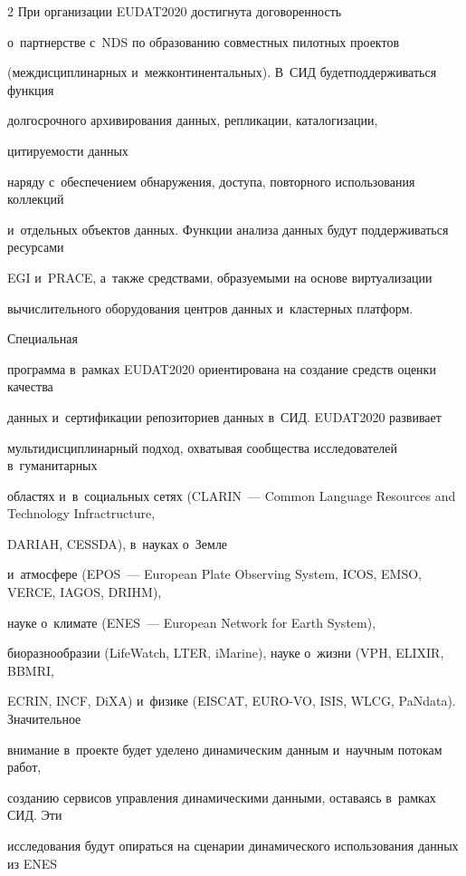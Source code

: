 \begin{multicols}{2}
При организации EUDAT2020 достигнута договоренность 


о~партнерстве с~NDS по образованию совместных пилотных проектов 


(междис\-цип\-линарных и~межконтинентальных). В~СИД будет\linebreak поддерживаться функция 


долгосрочного ар\-хи\-ви\-рования данных, репликации, каталогизации,\linebreak


 цитируемости данных 


наряду с~обеспечением обнаружения, доступа, повторного использования коллекций 


и~отдельных объектов данных. Функции анализа данных будут поддерживаться ресурсами 


EGI и~PRACE, а~так\-же средствами, образуемыми на основе виртуализации 


вычислительного оборудования центров данных и~кластерных платформ. 





Специальная 


программа в~рамках EUDAT2020 ориентирована на создание средств оценки качест\-ва 


данных и~сертификации репозиториев данных в~СИД. EUDAT2020 развивает 


мультидисциплинарный подход, охватывая сообщества исследователей в~гуманитарных 


областях и~в~социальных сетях (CLARIN~--- Common Language Resources and Technology Infractructure, 


DARIAH, CESSDA), в~науках о~Земле 


и~атмосфере (EPOS~--- European Plate Observing System, ICOS, EMSO, VERCE, IAGOS, DRIHM), 


науке о~климате (ENES~--- European Network for Earth System), 


биоразнообразии (LifeWatch, LTER, iMarine), науке о~жизни (VPH, ELIXIR, BBMRI, 


ECRIN, INCF, DiXA) и~физике (EISCAT, EURO-VO, ISIS, \mbox{WLCG}, PaNdata). Значительное 


внимание в~проекте будет уделено динамическим данным и~научным потокам работ, 


созданию сервисов управ\-ле\-ния динамическими данными, оставаясь в~рамках СИД. Эти 


исследования будут опираться на сценарии динамического использования данных из ENES 



\end{multicols}
